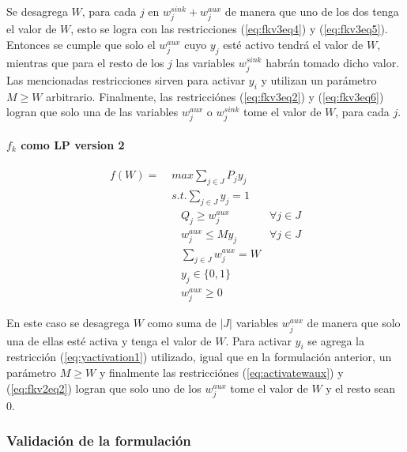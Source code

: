 \documentclass{article}
\begin{document}
  Se desagrega $W$, para cada $j$ en $w^{sink}_j + w^{aux}_j$ de manera que uno de los dos tenga el valor de $W$, esto se logra con las restricciones (\ref{eq:fkv3eq4}) y (\ref{eq:fkv3eq5}). Entonces se cumple que solo el $w^{aux}_j$ cuyo $y_j$ esté activo tendrá el valor de $W$, mientras que para el resto de los $j$ las variables $w^{sink}_j$ habrán tomado dicho valor. Las mencionadas restricciones sirven para activar $y_i$ y utilizan un parámetro $M \geq W$ arbitrario. Finalmente, las restricciónes (\ref{eq:fkv3eq2}) y (\ref{eq:fkv3eq6}) logran que solo una de las variables $w^{aux}_j$ o $w^{sink}_j$ tome el valor de $W$, para cada $j$.

  \paragraph*{$f_k$ como LP version 2}

  \begin{align}
    f(W) =\; & max \sum_{j \in J} P_j y_j             & \label{eq:fkv2eq1}\\
             & s.t. \sum_{j \in J} y_j = 1            & \label{eq:fkv2eq2}\\
             & \;\;\; Q_j \geq w^{aux}_j              & \forall j \in J \label{eq:implfkoriginalineq} \\
             & \;\;\; w^{aux}_j \leq M y_j            & \forall j \in J \label{eq:yactivation1} \\
             & \;\;\; \sum_{j \in J} w^{aux}_j = W    & \label{eq:activatewaux} \\
             & \;\;\; y_j \in \{0,1\}                 & \label{eq:fkv2domainy} \\
             & \;\;\; w^{aux}_j \geq 0                & \label{eq:fkv2eq6}
  \end{align}

  En este caso se desagrega $W$ como suma de $|J|$ variables $w^{aux}_j$ de manera que solo una de ellas esté activa y tenga el valor de $W$. Para activar $y_i$ se agrega la restricción (\ref{eq:yactivation1}) utilizado, igual que en la formulación anterior, un parámetro $M \geq W$ y finalmente las restricciónes (\ref{eq:activatewaux}) y (\ref{eq:fkv2eq2}) logran que solo uno de los $w^{aux}_j$ tome el valor de $W$ y el resto sean 0.

  \subsubsection{Validación de la formulación}
\end{document}

